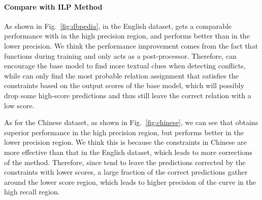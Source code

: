 \paragraph{Compare with ILP Method}
As shown in Fig.~\ref{fig:dbpedia}, in the English dataset,
\SL gets a comparable performance with \ILP in the high precision region, and performs better than \ILP in the lower precision.
We think the performance improvement comes from the fact that \SL functions during training and \ILP only acts as a post-processor.
Therefore, \SL can encourage the base model to find more textual clues when detecting conflicts, while \ILP can only find the most probable relation assignment that satisfies the constraints based on the output scores of the base model, which will possibly drop some high-score predictions and thus still leave the correct relation with a low score.

As for the Chinese dataset, as shown in Fig.~\ref{fig:chinese}, we can see that \SL obtains superior performance in the high precision region, but \ILP performs better in the lower precision region.
We think this is because the constraints in Chinese are more effective than that in the English dataset, which leads to more corrections of the \ILP method.
Therefore, since \ILP tend to leave the predictions corrected by the constraints with lower scores, a large fraction of the correct predictions gather around the lower score region, which leads to higher precision of the \ILP curve in the high recall region.




